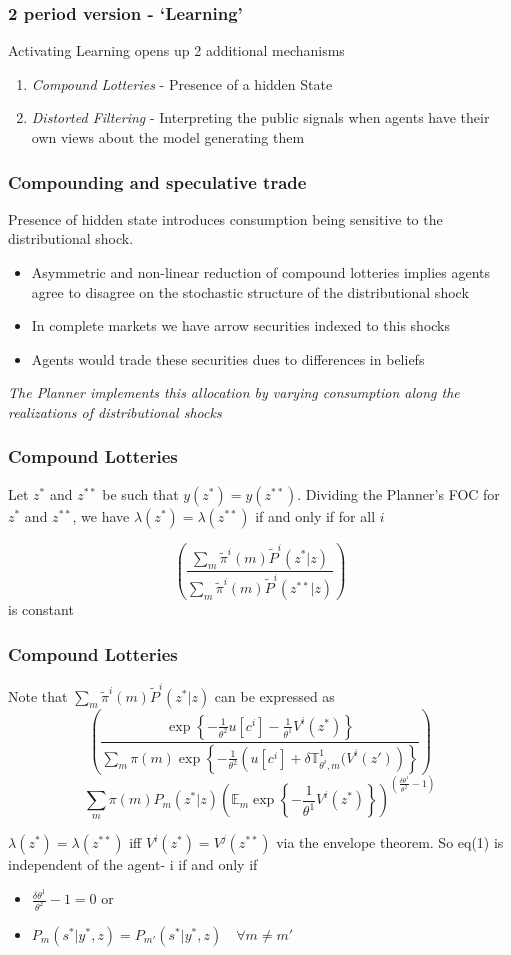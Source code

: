 \documentclass{beamer}
\theoremstyle{Definition}
\begin{document}
\begin{frame}
\frametitle{2 period version - `Learning'}

Activating Learning opens up 2 additional mechanisms
\begin{enumerate}
\item \emph{Compound Lotteries}  - Presence of a hidden State
\item \emph{Distorted Filtering } - Interpreting the public signals
  when agents have their own views about the model generating them
\end{enumerate}



\end{frame}
\begin{frame}
\frametitle{Compounding and speculative trade}
Presence of hidden state introduces consumption being sensitive to the
distributional shock. 
\begin{itemize}
\item Asymmetric and non-linear reduction of compound lotteries implies
  agents agree to  disagree on the stochastic structure of the
  distributional shock
\item  In complete markets we have arrow securities indexed to this
  shocks
\item Agents would trade these securities dues to differences in beliefs
\end{itemize}
\emph{The Planner implements this allocation by varying consumption along
the realizations of distributional shocks}
\end{frame}


\begin{frame}
\frametitle{Compound Lotteries}
Let $z^*$ and $z^{**}$ be such that $y(z^*)=y(z^{**})$. Dividing the Planner's FOC for $z^*$ and $z^{**}$, we have $\lambda(z^*)=\lambda(z^{**})$ if and only if for all $i$

\[\left(\frac{\sum_{m}\tilde \pi^i(m)\tilde P^i(z^*|z)}{\sum_{m}\tilde \pi^i(m)\tilde P^i(z^{**}|z)}\right)\] is constant
\end{frame}
\begin{frame}
\frametitle{Compound Lotteries}
\noindent Note that $\sum_{m}\tilde \pi^i(m)\tilde P^i(z^*|z)$ can be expressed as 
\scriptsize{\[\left(\frac{\exp\left\{-\frac{1}{\theta^2} u[c^i]-\frac{1}{\theta^1} V^i(z^*)\right \}}{\sum_{m}\pi(m)\exp\left\{-\frac{1}{\theta^2}\left(u[c^i]+\delta \mathbb{T}^{1}_{\theta^i,m}(V^i(z')\right)\right\}}\right)\]
\[\sum_{m}\pi(m)P_m(z^*|z)\left(\mathbb{E}_{m} \exp\left\{-\frac{1}{\theta^1} V^i(z^*)\right\}\right)^{\left(\frac{\delta\theta^1}{\theta^2}-1\right)}\]}

\noindent $\lambda(z^*)=\lambda(z^{**})$ iff $V^i(z^*)=V^j(z^{**})$ via the envelope theorem. So eq(1) is independent of the agent- i if and only if 
\begin{itemize}
	\item $\frac{\delta\theta^1}{\theta^2}-1=0$ or 
	\item $P_m(s^*|y^*,z)=P_{m'}(s^{*}|y^*,z)\quad \forall m\neq m'$
\end{itemize}
\end{frame}
\end{document}
